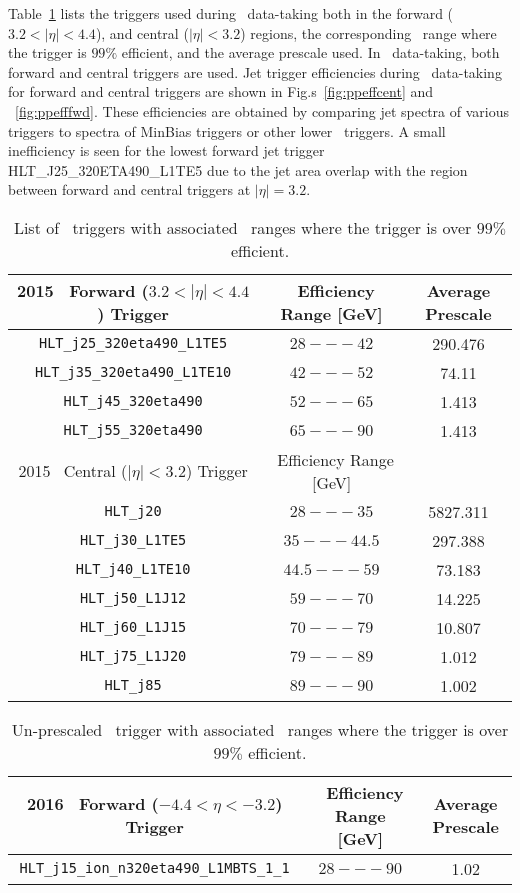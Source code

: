 Table~\ref{tab:pptriggers} lists the triggers used during \pp\ data-taking both in the forward ($3.2<|\eta|<4.4$), and central ($|\eta|<3.2$) regions, the corresponding \pT\ range where the trigger is $99\%$ efficient, and the average prescale used. In \pp\ data-taking, both forward and central triggers are used. Jet trigger efficiencies during \pp\ data-taking for forward and central triggers are shown in Fig.s~\ref{fig:ppeffcent} and ~\ref{fig:ppefffwd}. These efficiencies are obtained by comparing jet spectra of various triggers to spectra of MinBias triggers or other lower \pt\ triggers.   A small inefficiency is seen for the lowest forward jet trigger \textsc{HLT\_J25\_320ETA490\_L1TE5} due to the jet area overlap with the region between forward and central triggers at $|\eta| = 3.2$. 
          
\begin{table}
	\centering
	\begin{tabular}{|| c | c | c || } 
		\hline
		2015 \pp\ Forward ($3.2<|\eta|<4.4$) Trigger & \pT\ Efficiency Range [GeV] & Average Prescale \\ 
		\hline
		\verb|HLT_j25_320eta490_L1TE5| & $28---42$ & 290.476 \\ 
		\verb|HLT_j35_320eta490_L1TE10| & $42---52$ & 74.11  \\ 
		\verb|HLT_j45_320eta490| & $52---65$ & 1.413 \\ 
		\verb|HLT_j55_320eta490| & $65---90$ & 1.413 \\ 
		\hline \hline 
		2015 \pp\ Central ($|\eta|<3.2$) Trigger & \pT\ Efficiency Range [GeV] \\ 
		\hline
		\verb|HLT_j20| & $28---35$ & 5827.311 \\ 
		\verb|HLT_j30_L1TE5| & $35---44.5$ & 297.388 \\ 
		\verb|HLT_j40_L1TE10| & $44.5---59$ & 73.183 \\ 
		\verb|HLT_j50_L1J12| & $59---70$ & 14.225 \\ 
		\verb|HLT_j60_L1J15| & $70---79$ & 10.807 \\ 
		\verb|HLT_j75_L1J20| & $79---89$ & 1.012\\ 
		\verb|HLT_j85| & $89---90$ & 1.002 \\ 
		\hline 		
	\end{tabular}
	\caption{\label{tab:pptriggers} List of \pp\ triggers with associated \pT\ ranges where the trigger is over $99\%$ efficient.}
\end{table}


\begin{table}
	\centering
	\begin{tabular}{|| c | c | c || } 
		\hline
		2016 \pPb\ Forward ($-4.4<\eta<-3.2$) Trigger & \pT\ Efficiency Range [GeV] & Average Prescale \\ 
		\hline
		\verb|HLT_j15_ion_n320eta490_L1MBTS_1_1| & $28---90$ & 1.02 \\ 
		\hline
	\end{tabular}
	\caption{\label{tab:pPbtriggers} Un-prescaled \pPb\ trigger with associated \pT\ ranges where the trigger is over $99\%$ efficient.  }
\end{table}


